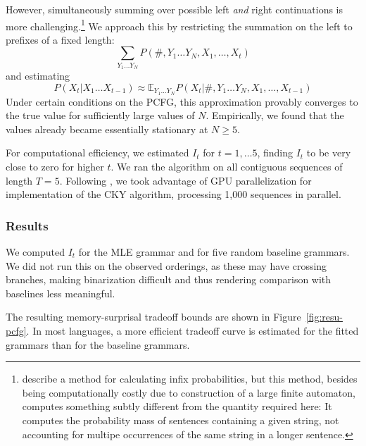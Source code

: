 \documentclass[11pt,letterpaper]{article}
\newcommand{\E}[0]{\mathbb{E}}
\begin{document}
However, simultaneously summing over possible left \emph{and} right continuations is more challenging.\footnote{\citet{DBLP:conf/emnlp/NederhofS11} describe a method for calculating infix probabilities, but this method, besides being computationally costly due to construction of a large finite automaton, computes something subtly different from the quantity required here: It computes the probability mass of sentences containing a given string, not accounting for multipe occurrences of the same string in a longer sentence.}
We approach this by restricting the summation on the left to prefixes of a fixed length:
\begin{equation}
    \sum_{Y_1\dots Y_N} P(\#, Y_1 \dots Y_N, X_1, \dots, X_t)
\end{equation}
and estimating
\begin{equation}
    P(X_t|X_1\dots X_{t-1}) \approx \E_{Y_1\dots Y_N} P(X_t|\#, Y_1 \dots Y_N, X_1, \dots, X_{t-1})
\end{equation}
Under certain conditions on the PCFG, this approximation provably converges to the true value for sufficiently large values of $N$.
Empirically, we found that the values already became essentially stationary at $N\geq 5$.

For computational efficiency, we estimated $I_t$ for $t=1, \dots 5$, finding $I_t$ to be very close to zero for higher $t$.
We ran the algorithm on all contiguous sequences of length $T=5$.
Following \cite{DBLP:conf/acl/KimDR19}, we took advantage of GPU parallelization for implementation of the CKY algorithm, processing 1,000 sequences in parallel.


\subsubsection{Results}
We computed $I_t$ for the MLE grammar and for five random baseline grammars.
We did not run this on the observed orderings, as these may have crossing branches, making binarization difficult and thus rendering comparison with baselines less meaningful.

The resulting memory-surprisal tradeoff bounds are shown in Figure~\ref{fig:resu-pcfg}.
In most languages, a more efficient tradeoff curve is estimated for the fitted grammars than for the baseline grammars.
\end{document}
